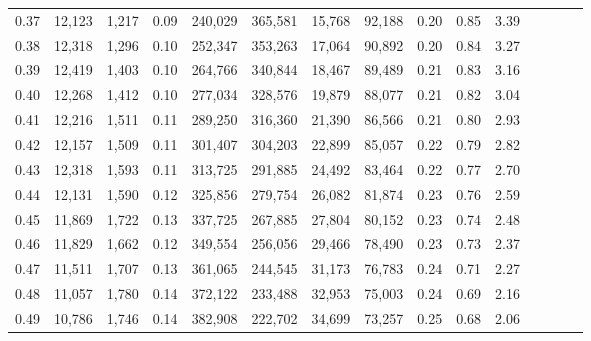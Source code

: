 \begin{tabular}{rrrcrrrrrrrrrrr}
0.37 &  12,123 &  1,217 &                                       0.09 &  240,029 &  365,581 &   15,768 &   92,188 &  0.20 &  0.85 &                         3.39 \\
0.38 &  12,318 &  1,296 &                                       0.10 &  252,347 &  353,263 &   17,064 &   90,892 &  0.20 &  0.84 &                         3.27 \\
0.39 &  12,419 &  1,403 &                                       0.10 &  264,766 &  340,844 &   18,467 &   89,489 &  0.21 &  0.83 &                         3.16 \\
0.40 &  12,268 &  1,412 &                                       0.10 &  277,034 &  328,576 &   19,879 &   88,077 &  0.21 &  0.82 &                         3.04 \\
0.41 &  12,216 &  1,511 &                                       0.11 &  289,250 &  316,360 &   21,390 &   86,566 &  0.21 &  0.80 &                         2.93 \\
0.42 &  12,157 &  1,509 &                                       0.11 &  301,407 &  304,203 &   22,899 &   85,057 &  0.22 &  0.79 &                         2.82 \\
0.43 &  12,318 &  1,593 &                                       0.11 &  313,725 &  291,885 &   24,492 &   83,464 &  0.22 &  0.77 &                         2.70 \\
0.44 &  12,131 &  1,590 &                                       0.12 &  325,856 &  279,754 &   26,082 &   81,874 &  0.23 &  0.76 &                         2.59 \\
0.45 &  11,869 &  1,722 &                                       0.13 &  337,725 &  267,885 &   27,804 &   80,152 &  0.23 &  0.74 &                         2.48 \\
0.46 &  11,829 &  1,662 &                                       0.12 &  349,554 &  256,056 &   29,466 &   78,490 &  0.23 &  0.73 &                         2.37 \\
0.47 &  11,511 &  1,707 &                                       0.13 &  361,065 &  244,545 &   31,173 &   76,783 &  0.24 &  0.71 &                         2.27 \\
0.48 &  11,057 &  1,780 &                                       0.14 &  372,122 &  233,488 &   32,953 &   75,003 &  0.24 &  0.69 &                         2.16 \\
0.49 &  10,786 &  1,746 &                                       0.14 &  382,908 &  222,702 &   34,699 &   73,257 &  0.25 &  0.68 &                         2.06 \\

\end{tabular}
